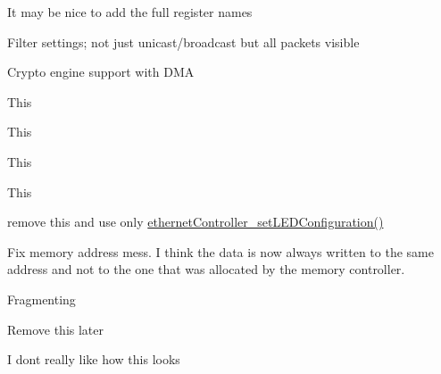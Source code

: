 
\begin{DoxyRefList}
\item[Module \mbox{\hyperlink{group___b_a_n_k__0}{B\+A\+N\+K\+\_\+0}} ]\label{todo__todo000004}%
%
It may be nice to add the full register names


\item[File \mbox{\hyperlink{_e_n_c424_j600_8c}{E\+N\+C424\+J600.c}} ]\label{todo__todo000001}%
%
Filter settings; not just unicast/broadcast but all packets visible  
\item[File \mbox{\hyperlink{_e_n_c424_j600_8h}{E\+N\+C424\+J600.h}} ]\label{todo__todo000003}%
%
Crypto engine support with D\+MA  
\item[Global \mbox{\hyperlink{group__init_gaadd13e81fe0097411b3aae2f6810bbe1}{ethernet\+Controller\+\_\+disable\+Ethernet}} ()]\label{todo__todo000007}%
%
This  
\item[Global \mbox{\hyperlink{group__init_ga7cb7d48ac9c1a7bd6393c95e6e07dcee}{ethernet\+Controller\+\_\+disable\+Transmission}} ()]\label{todo__todo000009}%
%
This  
\item[Global \mbox{\hyperlink{group__init_ga06ef512fd11e36bbefaad96993875d2b}{ethernet\+Controller\+\_\+enable\+Ethernet}} ()]\label{todo__todo000006}%
%
This  
\item[Global \mbox{\hyperlink{group__init_ga0aef586bd9434125367071595a794806}{ethernet\+Controller\+\_\+enable\+Transmission}} ()]\label{todo__todo000008}%
%
This  
\item[Global \mbox{\hyperlink{group__leds_ga88905c196e37262340f8404fcb61ecf9}{ethernet\+Controller\+\_\+set\+L\+E\+D\+Status}} (uint8\+\_\+t L\+ED, uint8\+\_\+t status)]\label{todo__todo000010}%
%
remove this and use only \mbox{\hyperlink{group__leds_ga3ec0343a266cb8a4925097d708dd96f4}{ethernet\+Controller\+\_\+set\+L\+E\+D\+Configuration()}}  
\item[Global \mbox{\hyperlink{group__data__transmission_ga9c0d9b39642cf6b7e220b9f0b44e3e02}{ethernet\+Controller\+\_\+stream\+To\+Transmit\+Buffer}} (uint8\+\_\+t data, uint16\+\_\+t len)]\label{todo__todo000002}%
%
Fix memory address mess. I think the data is now always written to the same address and not to the one that was allocated by the memory controller.  
\item[Global \mbox{\hyperlink{group__ipv4_ga9b32058fa6f24f692e0915345b3373b2}{ipv4\+\_\+stream\+To\+Transmission\+Buffer}} (uint8\+\_\+t data, ipv4\+\_\+packet\+\_\+t packet)]\label{todo__todo000012}%
%
Fragmenting  
\item[Global \mbox{\hyperlink{group__arp_gad629320d0e251b055167216baa76aff3}{print\+Arp\+Table}} ()]\label{todo__todo000011}%
%
Remove this later  
\item[Module \mbox{\hyperlink{group__rsv_bits}{rsv\+Bits}} ]\label{todo__todo000005}%
%
I don\textquotesingle{}t really like how this looks


\end{DoxyRefList}